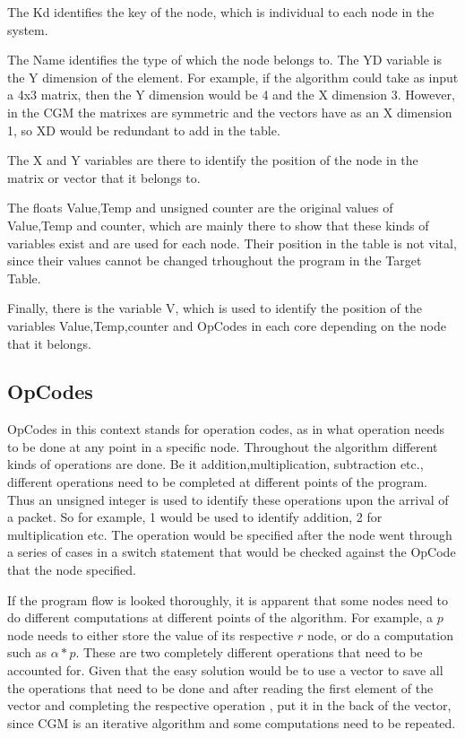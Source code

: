 \documentclass[12pt,a4paper]{article}
\begin{document}
The Kd identifies the key of the node, which is individual to each node in the system. 

The Name identifies the type of which the node belongs to. The YD variable is the Y dimension of the element. For example, if the algorithm could take as input a 4x3 matrix, then the Y dimension would be 4 and the X dimension 3. However, in the CGM the matrixes are symmetric and the vectors have as an X dimension 1, so XD would be redundant to add in the table. 

The X and Y variables are there to identify the position of the node in the matrix or vector that it belongs to. 

The floats Value,Temp and unsigned counter are the original values of Value,Temp and counter, which are mainly there to show that these kinds of variables exist and are used for each node. Their position in the table is not vital, since their values cannot be changed trhoughout the program in the Target Table. 

Finally, there is the variable V, which is used to identify the position of the variables Value,Temp,counter and OpCodes in each core depending on the node that it belongs.
\subsection{OpCodes}
OpCodes in this context stands for operation codes, as in what operation needs to be done at any point in a specific node. Throughout the algorithm different kinds of operations are done. Be it addition,multiplication, subtraction etc., different operations need to be completed at different points of the program. Thus an unsigned integer is used to identify these operations upon the arrival of a packet. So for example, 1 would be used to identify addition, 2 for multiplication etc. The operation would be specified after the node went through a series of cases in a switch statement that would be checked against the OpCode that the node specified.

If the program flow is looked thoroughly, it is apparent that some nodes need to do different computations at different points of the algorithm. For example, a $p$ node needs to either store the value of its respective $r$ node, or do a computation such as $\alpha *p$. These are two completely different operations that need to be accounted for. Given that the easy solution would be to use a vector to save all the operations that need to be done and after reading the first element of the vector and completing the respective operation , put it in the back of the vector, since CGM is an iterative algorithm and some computations need to be repeated.
\end{document}
